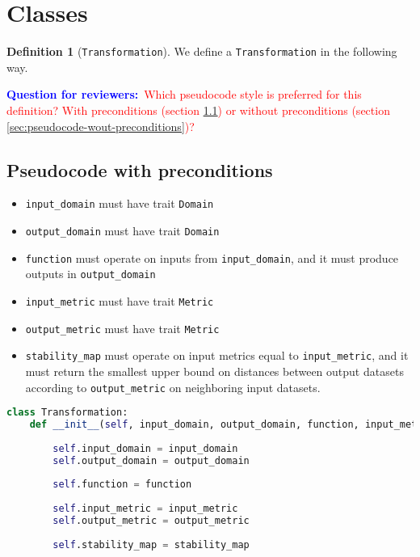 \documentclass[11pt,a4paper]{article}
\theoremstyle{definition}
\newtheorem{definition}[theorem]{Definition}
\newcommand{\questionr}[1]{\textcolor{blue}{\textbf{Question for reviewers:}}\textcolor{red}{~#1}}
\begin{document}
\section{Classes}
\begin{definition}[\texttt{Transformation}]
    We define a \texttt{Transformation} in the following way.
    
    \questionr{Which pseudocode style is preferred for this definition? With preconditions (section \ref{sec:pseudocode-w-preconditions}) or without preconditions (section \ref{sec:pseudocode-wout-preconditions})?}
    
\subsection{Pseudocode with preconditions}
\label{sec:pseudocode-w-preconditions}
\begin{itemize}
    \item \texttt{input\_domain} must have trait \texttt{Domain}
    \item \texttt{output\_domain} must have trait \texttt{Domain}
    \item \texttt{function} must operate on inputs from \texttt{input\_domain}, and it must produce outputs in \texttt{output\_domain}
    \item \texttt{input\_metric} must have trait \texttt{Metric}
    \item \texttt{output\_metric} must have trait \texttt{Metric}
    \item \texttt{stability\_map} must operate on input metrics equal to \texttt{input\_metric}, and it must return the smallest upper bound on distances between output datasets according to \texttt{output\_metric} on neighboring input datasets.
\end{itemize}
\begin{lstlisting}[language=Python]
class Transformation:
    def __init__(self, input_domain, output_domain, function, input_metric, output_metric, stability_map):
        
        self.input_domain = input_domain
        self.output_domain = output_domain
        
        self.function = function
        
        self.input_metric = input_metric
        self.output_metric = output_metric
        
        self.stability_map = stability_map
\end{lstlisting}
    

\end{definition}
\end{document}
